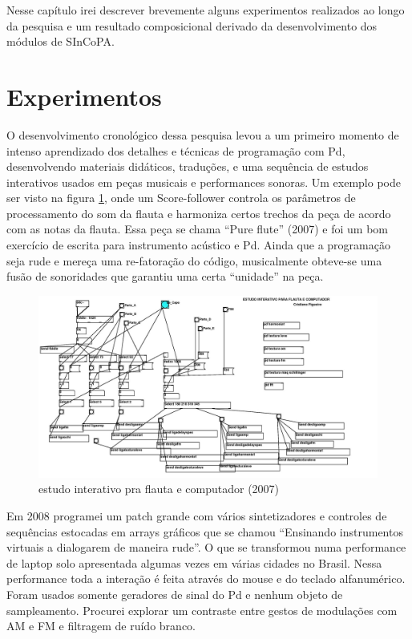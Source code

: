 \documentclass{ppgmus}
\begin{document}
Nesse capítulo irei descrever brevemente alguns experimentos realizados
ao longo da pesquisa e um resultado composicional derivado
da desenvolvimento dos módulos de SInCoPA.

\section{Experimentos}
\label{experimentos}

O desenvolvimento cronológico dessa pesquisa levou a um primeiro momento de intenso aprendizado
dos detalhes e técnicas de programação com Pd, desenvolvendo materiais didáticos, traduções, e uma
sequência de estudos interativos usados em peças musicais e performances sonoras. Um exemplo pode ser visto
na figura \ref{flauta2007}, onde um Score-follower controla os parâmetros de 
processamento do som da flauta e harmoniza certos trechos da peça de acordo com as notas da flauta.
Essa peça se chama ``Pure flute'' (2007) e foi um bom exercício de escrita para instrumento acústico
e Pd. Ainda que a programação seja rude e mereça uma re-fatoração do código, musicalmente 
obteve-se uma fusão de sonoridades que garantiu uma certa ``unidade'' na peça.

\begin{figure}
\includegraphics[scale=.3]{flauta2007}
\caption{estudo interativo pra flauta e computador (2007)}
\label{flauta2007}
\end{figure} 

Em 2008 programei um patch grande com vários sintetizadores e controles de sequências estocadas
em arrays gráficos que se chamou ``Ensinando instrumentos virtuais a dialogarem de maneira rude''.
O que se transformou numa performance de laptop solo apresentada algumas vezes em várias
cidades no Brasil. Nessa performance toda a interação é feita através do mouse e do 
teclado alfanumérico. Foram usados somente geradores de sinal do Pd e nenhum objeto de sampleamento.
 Procurei explorar um contraste entre gestos de modulações com AM e FM e filtragem de ruído branco.
\end{document}
